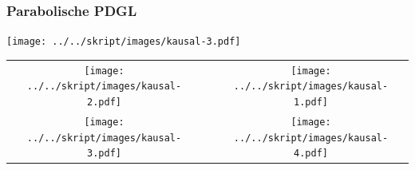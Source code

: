 \documentclass[handout]{beamer}
\begin{document}
\begin{frame}
\frametitle{Parabolische PDGL}
\begin{center}
\texttt{[image: ../../skript/images/kausal-3.pdf]}
\end{center}
\end{frame}

\begin{frame}
\begin{center}
\begin{tabular}{ccc}
\texttt{[image: ../../skript/images/kausal-2.pdf]}&&
\texttt{[image: ../../skript/images/kausal-1.pdf]}\\
\texttt{[image: ../../skript/images/kausal-3.pdf]}&&
\texttt{[image: ../../skript/images/kausal-4.pdf]}
\end{tabular}
\end{center}
\end{frame}
\end{document}
